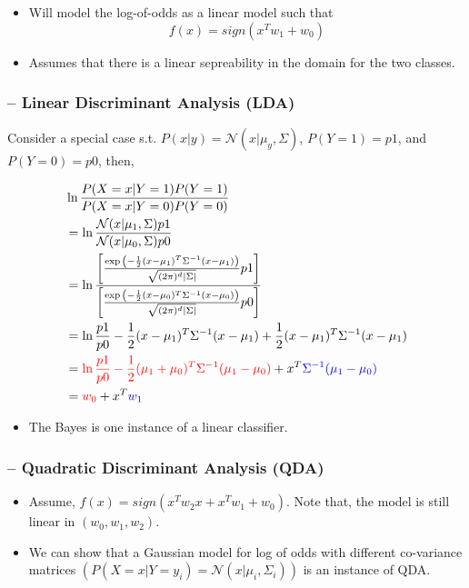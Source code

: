 \documentclass{article}
\newcommand{\red}[1]{\textcolor{red}{#1}}
\newcommand{\blue}[1]{\textcolor{blue}{#1}}
\begin{document}
\begin{itemize}
    \item Will model the log-of-odds as a linear model such that $$f(x) = sign(x^Tw_1+w_0)$$
    \item Assumes that there is a linear sepreability in the domain for the two classes.
\end{itemize}

\subsubsection{-- Linear Discriminant Analysis (LDA)}
Consider a special case s.t. $P(x|y) = \mathcal{N}(x|\mu_y, \Sigma)$, $P(Y=1) = p1$, and $P(Y=0)=p0$, then,

\begin{align*}
    &\ln{\frac{P(X=x|Y=1)P(Y=1)}{P(X=x|Y=0)P(Y=0)}}\\
    &= \ln{\frac{\mathcal{N}(x|\mu_1,\Sigma)p1}{\mathcal{N}(x|\mu_0,\Sigma)p0}} \\
    &= \ln{\frac{\left[\frac{\exp{\left(-\frac{1}{2}(x-\mu_1)^T\Sigma^{-1}(x-\mu_1)\right)}}{\sqrt{(2\pi)^d|\Sigma|}}p1\right]}{\left[\frac{\exp{\left(-\frac{1}{2}(x-\mu_0)^T\Sigma^{-1}(x-\mu_0)\right)}}{\sqrt{(2\pi)^d|\Sigma|}}p0\right]}} \\
    &= \ln{\frac{p1}{p0}}-\frac{1}{2}(x-\mu_1)^T\Sigma^{-1}(x-\mu_1) + \frac{1}{2}(x-\mu_1)^T\Sigma^{-1}(x-\mu_1)\\
    &= \red{\ln{\frac{p1}{p0}}-\frac{1}{2}(\mu_1+\mu_0)^T\Sigma^{-1}(\mu_1-\mu_0)} + x^T\blue{\Sigma^{-1}(\mu_1-\mu_0)}\\
    &= \red{w_0} + x^T\blue{w_1}\\
\end{align*}

\begin{itemize}
    \item The Bayes is one instance of a linear classifier.
\end{itemize}

\subsubsection{-- Quadratic Discriminant Analysis (QDA)}

\begin{itemize}
    \item Assume, $f(x) = sign(x^Tw_2x + x^Tw_1 + w_0)$. Note that, the model is still linear in $(w_0, w_1, w_2)$.
    \item We can show that a Gaussian model for log of odds with different co-variance matrices $(P(X=x|Y=y_i) = \mathcal{N}(x|\mu_i,\Sigma_i))$ is an instance of QDA.
\end{itemize}
\end{document}
